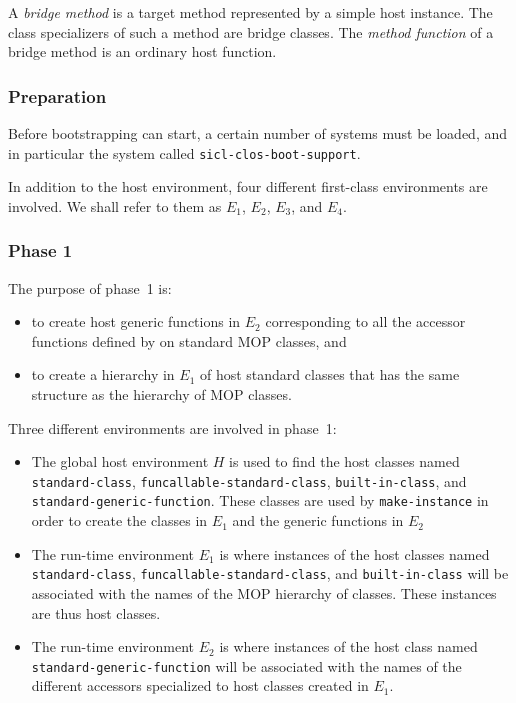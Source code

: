 \begin{definition}
A \emph{bridge method} is a target method represented by a simple host
instance.  The class specializers of such a method are bridge classes.%
The \emph{method function} of a bridge method is an ordinary host
function.
\end{definition}

\subsubsection{Preparation}

Before bootstrapping can start, a certain number of \asdf{} systems
must be loaded, and in particular the system called
\texttt{sicl-clos-boot-support}.

In addition to the host environment, four different \sysname{}
first-class environments are involved.  We shall refer to them as
$E_1$, $E_2$, $E_3$, and $E_4$.

\subsubsection{Phase 1}

The purpose of phase~1 is:

\begin{itemize}
\item to create host generic functions in $E_2$ corresponding to all
  the accessor functions defined by \sysname{} on standard MOP
  classes, and
\item to create a hierarchy in $E_1$ of host standard classes that has
  the same structure as the hierarchy of MOP classes.
\end{itemize}


Three different environments are involved in phase~1:

\begin{itemize}
\item The global host environment $H$ is used to find the host classes
  named \texttt{standard-class}, \texttt{funcallable-standard-class},
  \texttt{built-in-class}, and \texttt{standard-generic-function}.
  These classes are used by \texttt{make-instance} in order to create
  the classes in $E_1$ and the generic functions in $E_2$
\item The run-time environment $E_1$ is where instances of the host
  classes named \texttt{standard-class},
  \texttt{funcallable-standard-class}, and \texttt{built-in-class}
  will be associated with the names of the MOP hierarchy of classes.
  These instances are thus host classes.
\item The run-time environment $E_2$ is where instances of the host
  class named \texttt{standard-generic-function} will be associated
  with the names of the different accessors specialized to host
  classes created in $E_1$.
\end{itemize}

